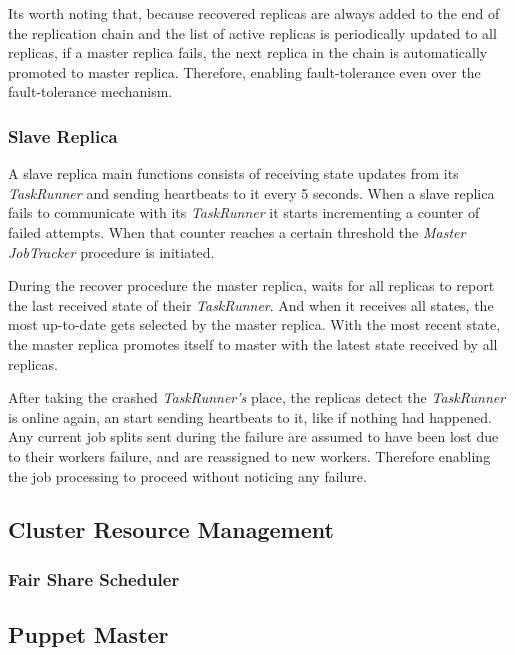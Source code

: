 \documentclass[times, 10pt,twocolumn]{article}
\begin{document}
            Its worth noting that, because recovered replicas are always added to the end of the replication chain and the list of active replicas is periodically updated to all replicas, if a master replica fails, the next replica in the chain is automatically promoted to master replica. Therefore, enabling fault-tolerance even over the fault-tolerance mechanism.
        	
        	\subsubsection{Slave Replica}\label{slave-replica}
            
            A slave replica main functions consists of receiving state updates from its \textit{TaskRunner} and sending heartbeats to it every 5 seconds. When a slave replica fails to communicate with its \textit{TaskRunner} it starts incrementing a counter of failed attempts. When that counter reaches a certain threshold the \textit{Master JobTracker} procedure is initiated.
            
            During the recover procedure the master replica, waits for all replicas to report the last received state of their \textit{TaskRunner}. And when it receives all states, the most up-to-date gets selected by the master replica. With the most recent state, the master replica promotes itself to master with the latest state received by all replicas.
            
            After taking the crashed \textit{TaskRunner's} place, the replicas detect the \textit{TaskRunner} is online again, an start sending heartbeats to it, like if nothing had happened. Any current job splits sent during the failure are assumed to have been lost due to their workers failure, and are reassigned to new workers. Therefore enabling the job processing to proceed without noticing any failure.
    	
    	\subsection{Cluster Resource Management}\label{cluster-man}
    	
            \subsubsection{Fair Share Scheduler}

    	\subsection{Puppet Master}
        
\end{document}

